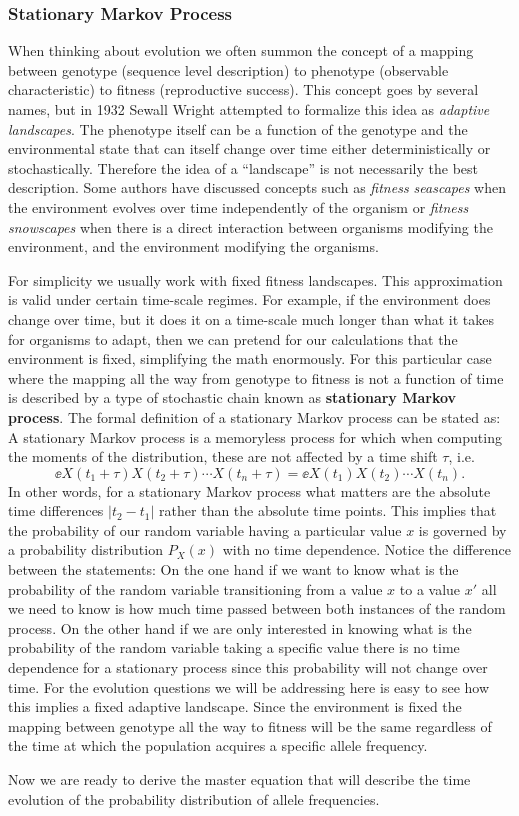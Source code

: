 \subsubsection{Stationary Markov Process}\label{sec_stationary_process}

When thinking about evolution we often summon the concept of a mapping between
genotype (sequence level description) to phenotype (observable characteristic)
to fitness (reproductive success). This concept goes by several names, but in
1932 Sewall Wright attempted to formalize this idea as \textit{adaptive
landscapes}. The phenotype itself can be a function of the genotype and the
environmental state that can itself change over time either deterministically
or stochastically. Therefore the idea of a ``landscape'' is not necessarily the
best description. Some authors have discussed concepts such as \textit{fitness
seascapes} when the environment evolves over time independently of the organism
or \textit{fitness snowscapes} when there is a direct interaction between
organisms modifying the environment, and the environment modifying the
organisms.

For simplicity we usually work with fixed fitness landscapes. This
approximation is valid under certain time-scale regimes. For example, if the
environment does change over time, but it does it on a time-scale much longer
than what it takes for organisms to adapt, then we can pretend for our
calculations that the environment is fixed, simplifying the math enormously.
For this particular case where the mapping all the way from genotype to fitness
is not a function of time is described by a type of stochastic chain known as
\textbf{stationary Markov process}. The formal definition of a stationary
Markov process can be stated as: A stationary Markov process is a memoryless
process for which when computing the moments of the distribution, these are not
affected by a time shift $\tau$, i.e.
\begin{equation}
  \ee{X(t_1 + \tau) X(t_2 + \tau) \cdots X(t_n + \tau)} =
  \ee{X(t_1) X(t_2) \cdots X(t_n)}.
\end{equation}
In other words, for a stationary Markov process what matters are the absolute
time differences $|t_2 - t_1|$ rather than the absolute time points. This
implies that the probability of our random variable having a particular value
$x$ is governed by a probability distribution $P_X(x)$ with no time dependence.
Notice the difference between the statements: On the one hand if we want to
know what is the probability of the random variable transitioning from a value
$x$ to a value $x'$ all we need to know is how much time passed between both
instances of the random process. On the other hand if we are only interested in
knowing what is the probability of the random variable taking a specific value
there is no time dependence for a stationary process since this probability
will not change over time. For the evolution questions we will be addressing
here is easy to see how this implies a fixed adaptive landscape. Since the
environment is fixed the mapping between genotype all the way to fitness will
be the same regardless of the time at which the population acquires a specific
allele frequency.

Now we are ready to derive the master equation that will describe the time
evolution of the probability distribution of allele frequencies.